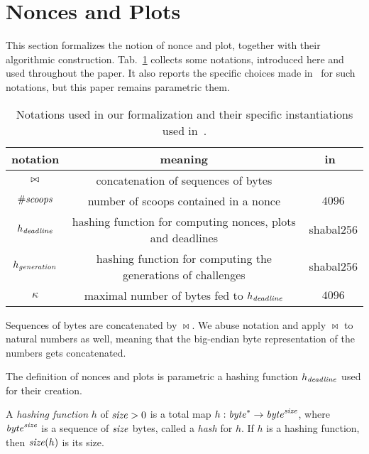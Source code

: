 \section{Nonces and Plots}\label{sec:nonces_and_plots}

This section formalizes the notion of nonce and plot, together with their
algorithmic construction. Tab.~\ref{tab:notations} collects some notations,
introduced here and used throughout the paper.
It also reports the specific choices
made in~\cite{SignumPlotting} for such notations, but this paper remains parametric
\wrt them.

\begin{table}[t]
\begin{center}
\begin{tabular}{|c|c|c|}
  \hline
  \textbf{notation} & \textbf{meaning} & \textbf{in~\cite{SignumPlotting}}\\\hline\hline

  $\operatorname*{\bowtie}$ & concatenation of sequences of bytes & \\\hline
  ${\#\mathit{scoops}}$ & number of scoops contained in a nonce & $4096$\\\hline

  $h_{\mathit{deadline}}$ & hashing function for computing nonces, plots and deadlines & shabal256\\\hline

  $h_{\mathit{generation}}$ & hashing function for computing the generations of challenges & shabal256\\\hline

  $\kappa$ & maximal number of bytes fed to $h_{\mathit{deadline}}$ & $4096$\\\hline

\end{tabular}
\end{center}
\caption{Notations used in our formalization and their specific instantiations
  used in~\cite{SignumPlotting}.}
\label{tab:notations}
\end{table}
%
\begin{definition}
  Sequences of bytes are concatenated by $\bowtie$. We abuse notation
  and apply $\bowtie$ to natural numbers as well, meaning that
  the big-endian byte representation of the numbers gets concatenated.
\end{definition}
%
The definition of nonces and plots is parametric \wrt a hashing
function $h_{\mathit{deadline}}$ used for their creation.
%
\begin{definition}
  A \emph{hashing function} $h$ of ${\mathit{size}}>0$
  is a total map $h:\mathit{byte}^*\to\mathit{byte}^{\mathit{size}}$, where
  $\mathit{byte}^{\mathit{size}}$ is a sequence of ${\mathit{size}}$ bytes, called a \emph{hash} for $h$.
  If $h$ is a hashing function, then ${\mathit{size}}(h)$ is its size.
\end{definition}
